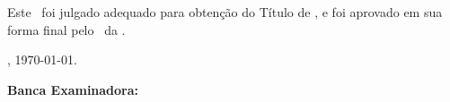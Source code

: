 \begin{folhadeaprovacao}
    \setlength{\ABNTEXsignskip}{2cm}
    \begin{center}
    {\imprimirautor}
        \vspace*{\fill}\vspace*{\fill}
        \begin{center}
            \ABNTEXchapterfont\bfseries{\imprimirtitulo}
        \end{center}
        \vspace*{\fill}
        \begin{minipage}{\textwidth}
            Este \imprimirtipotrabalho~foi julgado adequado para obtenção do Título de \printformation,
            e foi aprovado em sua forma final pelo \printprogram~da \printuniversity.
        \end{minipage}%
    \end{center}

    \begin{center}
        \imprimirlocal, \today.
    \end{center}


    \begin{flushleft}
        \textbf{Banca Examinadora:}
    \end{flushleft}




\end{folhadeaprovacao}

